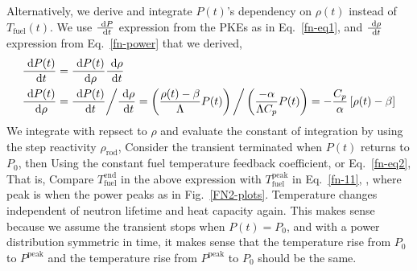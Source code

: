 \documentclass{school-22.211-notes}
\begin{document}
Alternatively, we derive and integrate $P(t)$'s dependency on $\rho(t)$ instead of $T_{\mathrm{fuel}}(t)$. We use $\frac{\mbox{ }\mathrm{d} P}{\mbox{ }\mathrm{d} t}$ expression from the PKEs as in Eq.~\ref{fn-eq1}, and $\frac{\mbox{ }\mathrm{d} \rho}{\mbox{ }\mathrm{d} t}$ expression from Eq.~\ref{fn-power} that we derived, 
\begin{align}
\frac{\mbox{ }\mathrm{d} P(t)}{\mbox{ }\mathrm{d} t} &= \frac{\mbox{ }\mathrm{d} P(t)}{\mbox{ }\mathrm{d} \rho} \frac{\mbox{ }\mathrm{d} \rho}{\mbox{ }\mathrm{d} t}  \\
\frac{\mbox{ }\mathrm{d} P(t)}{\mbox{ }\mathrm{d} \rho} &=  \frac{\mbox{ }\mathrm{d} P(t)}{\mbox{ }\mathrm{d} t} \bigg/  \frac{\mbox{ }\mathrm{d} \rho}{\mbox{ }\mathrm{d} t}  
=   \left( \frac{\rho(t) - \beta}{\Lambda} P(t) \right) \bigg/ \left( \frac{-\alpha}{\Lambda C_p } P(t) \right) = - \frac{C_p}{\alpha} \left[ \rho(t) - \beta \right] 
\end{align}
We integrate with repsect to $\rho$ and evaluate the constant of integration by using the step reactivity $\rho_{\mathrm{rod}}$, 
Consider the transient terminated when $P(t)$ returns to $P_0$, then 
Using the constant fuel temperature feedback coefficient, or Eq.~\ref{fn-eq2}, 
That is, 
  Compare $T_{\mathrm{fuel}}^{\mathrm{end}}$ in the above expression with $T_{\mathrm{fuel}}^{\mathrm{peak}}$ in Eq.~\ref{fn-11}, , where peak is when the power peaks as in Fig.~\ref{FN2-plots}. Temperature changes independent of neutron lifetime and heat capacity again. This makes sense because we assume the transient stops when $P(t) = P_0$, and with a power distribution symmetric in time, it makes sense that the temperature rise from $P_0$ to $P^{\mathrm{peak}}$ and the temperature rise from $P^{\mathrm{peak}}$ to $P_0$ should be the same. 
\end{document}
